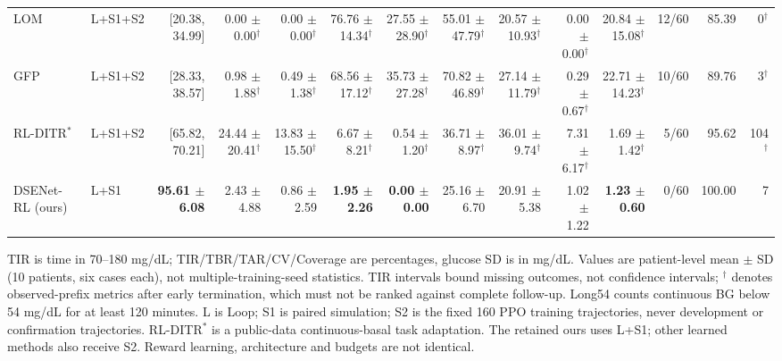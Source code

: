 \begin{table}[t]
{\begin{tabular}{llrrrrrrrrrrrr}
LOM & L+S1+S2 & [20.38, 34.99] & 0.00 $\pm$ 0.00$^{\dagger}$ & 0.00 $\pm$ 0.00$^{\dagger}$ & 76.76 $\pm$ 14.34$^{\dagger}$ & 27.55 $\pm$ 28.90$^{\dagger}$ & 55.01 $\pm$ 47.79$^{\dagger}$ & 20.57 $\pm$ 10.93$^{\dagger}$ & 0.00 $\pm$ 0.00$^{\dagger}$ & 20.84 $\pm$ 15.08$^{\dagger}$ & 12/60 & 85.39 & 0$^{\dagger}$ \\
GFP & L+S1+S2 & [28.33, 38.57] & 0.98 $\pm$ 1.88$^{\dagger}$ & 0.49 $\pm$ 1.38$^{\dagger}$ & 68.56 $\pm$ 17.12$^{\dagger}$ & 35.73 $\pm$ 27.28$^{\dagger}$ & 70.82 $\pm$ 46.89$^{\dagger}$ & 27.14 $\pm$ 11.79$^{\dagger}$ & 0.29 $\pm$ 0.67$^{\dagger}$ & 22.71 $\pm$ 14.23$^{\dagger}$ & 10/60 & 89.76 & 3$^{\dagger}$ \\
RL-DITR$^{*}$ & L+S1+S2 & [65.82, 70.21] & 24.44 $\pm$ 20.41$^{\dagger}$ & 13.83 $\pm$ 15.50$^{\dagger}$ & 6.67 $\pm$ 8.21$^{\dagger}$ & 0.54 $\pm$ 1.20$^{\dagger}$ & 36.71 $\pm$ 8.97$^{\dagger}$ & 36.01 $\pm$ 9.74$^{\dagger}$ & 7.31 $\pm$ 6.17$^{\dagger}$ & 1.69 $\pm$ 1.42$^{\dagger}$ & 5/60 & 95.62 & 104$^{\dagger}$ \\
DSENet-RL (ours) & L+S1 & \textbf{95.61 $\pm$ 6.08} & 2.43 $\pm$ 4.88 & 0.86 $\pm$ 2.59 & \textbf{1.95 $\pm$ 2.26} & \textbf{0.00 $\pm$ 0.00} & 25.16 $\pm$ 6.70 & 20.91 $\pm$ 5.38 & 1.02 $\pm$ 1.22 & \textbf{1.23 $\pm$ 0.60} & 0/60 & 100.00 & 7 \\
\bottomrule
\end{tabular}}
\par\smallskip\raggedright\footnotesize
TIR is time in 70--180 mg/dL; TIR/TBR/TAR/CV/Coverage are percentages, glucose SD is in mg/dL. Values are patient-level mean $\pm$ SD (10 patients, six cases each), not multiple-training-seed statistics. TIR intervals bound missing outcomes, not confidence intervals; $^{\dagger}$ denotes observed-prefix metrics after early termination, which must not be ranked against complete follow-up. Long54 counts continuous BG below 54 mg/dL for at least 120 minutes. L is Loop; S1 is paired simulation; S2 is the fixed 160 PPO training trajectories, never development or confirmation trajectories. RL-DITR$^*$ is a public-data continuous-basal task adaptation. The retained ours uses L+S1; other learned methods also receive S2. Reward learning, architecture and budgets are not identical.
\end{table}
